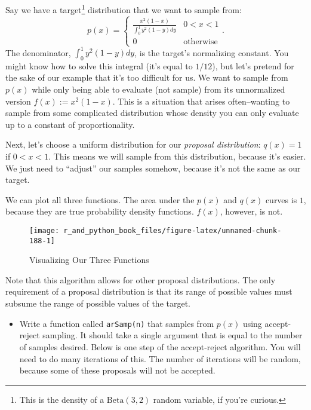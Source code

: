 \documentclass[12pt,krantz2]{krantz}
\providecommand{\tightlist}{%
  \setlength{\itemsep}{0pt}\setlength{\parskip}{0pt}}
\begin{document}
Say we have a target\footnote{This is the density of a \(\text{Beta}(3,2)\) random variable, if you're curious.} distribution that we want to sample from:
\begin{equation} 
p(x) = 
\begin{cases}
\frac{x^2(1-x)}{\int_0^1 y^2(1-y) dy} & 0 < x < 1 \\
0 & \text{otherwise}
\end{cases}.
\end{equation}
The denominator, \(\int_0^1 y^2(1-y) dy\), is the target's normalizing constant. You might know how to solve this integral (it's equal to \(1/12\)), but let's pretend for the sake of our example that it's too difficult for us. We want to sample from \(p(x)\) while only being able to evaluate (not sample) from its unnormalized version \(f(x) := x^2(1-x)\). This is a situation that arises often--wanting to sample from some complicated distribution whose density you can only evaluate up to a constant of proportionality.

Next, let's choose a uniform distribution for our \emph{proposal distribution}: \(q(x) = 1\) if \(0 < x < 1\). This means we will sample from this distribution, because it's easier. We just need to ``adjust'' our samples somehow, because it's not the same as our target.

We can plot all three functions. The area under the \(p(x)\) and \(q(x)\) curves is \(1\), because they are true probability density functions. \(f(x)\), however, is not.

\begin{figure}

{\centering \texttt{[image: r\_and\_python\_book\_files/figure-latex/unnamed-chunk-188-1]} 

}

\caption{Visualizing Our Three Functions}\label{fig:unnamed-chunk-188}
\end{figure}

Note that this algorithm allows for other proposal distributions. The only requirement of a proposal distribution is that its range of possible values must subsume the range of possible values of the target.

\begin{itemize}
\tightlist
\item
  Write a function called \texttt{arSamp(n)} that samples from \(p(x)\) using accept-reject sampling. It should take a single argument that is equal to the number of samples desired. Below is one step of the accept-reject algorithm. You will need to do many iterations of this. The number of iterations will be random, because some of these proposals will not be accepted.
\end{itemize}
\end{document}
